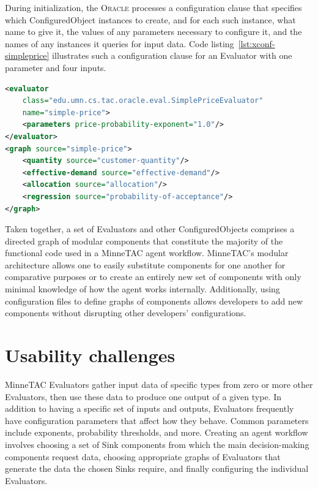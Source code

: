 \documentclass{article}
\begin{document}
During initialization, the \textsc{Oracle} processes a configuration clause that specifies which ConfiguredObject instances to create, and for each such instance, what name to give it, the values of any parameters necessary to configure it, and the names of any instances it queries for input data.
Code listing~\ref{lst:xconf-simpleprice} illustrates such a configuration clause for an Evaluator with one parameter and four inputs.

{\small
\begin{lstlisting}[language={XML},frame={single},
label={lst:xconf-simpleprice},caption={Configuration clause for a price
evaluator that uses one parameter and several inputs}]
<evaluator
    class="edu.umn.cs.tac.oracle.eval.SimplePriceEvaluator"
    name="simple-price">
    <parameters price-probability-exponent="1.0"/>
</evaluator>
<graph source="simple-price">
    <quantity source="customer-quantity"/>
    <effective-demand source="effective-demand"/>
    <allocation source="allocation"/>
    <regression source="probability-of-acceptance"/>
</graph>
\end{lstlisting}
}

Taken together, a set of Evaluators and other ConfiguredObjects comprises a directed graph of modular components that constitute the majority of the functional code used in a MinneTAC agent workflow.
MinneTAC's modular architecture allows one to easily substitute components for one another for comparative purposes or to create an entirely new set of components with only minimal knowledge of how the agent works internally.
Additionally, using configuration files to define graphs of components allows developers to add new components without disrupting other developers' configurations.

\section{Usability challenges}
\label{sec:challenges}

MinneTAC Evaluators gather input data of specific types from zero or more other Evaluators, then use these data to produce one output of a given type.
In addition to having a specific set of inputs and outputs, Evaluators frequently have configuration parameters that affect how they behave.
Common parameters include exponents, probability thresholds, and more.
Creating an agent workflow involves choosing a set of Sink components from which the main decision-making components request data, choosing appropriate graphs of Evaluators that generate the data the chosen Sinks require, and finally configuring the individual Evaluators.~\cite{Collins08TR}
\end{document}
